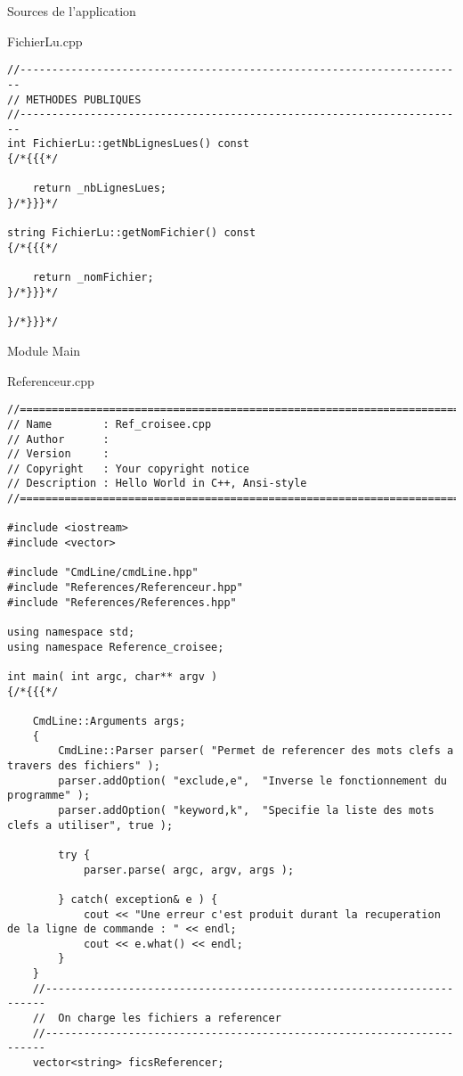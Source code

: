 \documentclass{article}
\begin{document}
\begin{section}{Sources de l'application}
\begin{paragraph}{FichierLu.cpp}
\begin{verbatim}
//----------------------------------------------------------------------
// METHODES PUBLIQUES
//----------------------------------------------------------------------
int FichierLu::getNbLignesLues() const
{/*{{{*/

    return _nbLignesLues;
}/*}}}*/

string FichierLu::getNomFichier() const
{/*{{{*/

    return _nomFichier;
}/*}}}*/

}/*}}}*/
  \end{verbatim}
  \end{paragraph}







  \begin{subsection}{Module Main}
   

\newpage
  \begin{paragraph}{Referenceur.cpp}
   \begin{verbatim}
//============================================================================
// Name        : Ref_croisee.cpp
// Author      :
// Version     :
// Copyright   : Your copyright notice
// Description : Hello World in C++, Ansi-style
//============================================================================

#include <iostream>
#include <vector>

#include "CmdLine/cmdLine.hpp"
#include "References/Referenceur.hpp"
#include "References/References.hpp"

using namespace std;
using namespace Reference_croisee;

int main( int argc, char** argv )
{/*{{{*/

    CmdLine::Arguments args;
    {
        CmdLine::Parser parser( "Permet de referencer des mots clefs a travers des fichiers" );
        parser.addOption( "exclude,e",  "Inverse le fonctionnement du programme" );
        parser.addOption( "keyword,k",  "Specifie la liste des mots clefs a utiliser", true );

        try {
            parser.parse( argc, argv, args );

        } catch( exception& e ) {
            cout << "Une erreur c'est produit durant la recuperation de la ligne de commande : " << endl;
            cout << e.what() << endl;
        }
    }
    //----------------------------------------------------------------------
    //  On charge les fichiers a referencer
    //----------------------------------------------------------------------
    vector<string> ficsReferencer;


\end{verbatim}
\end{paragraph}
\end{subsection}
\end{section}
\end{document}
